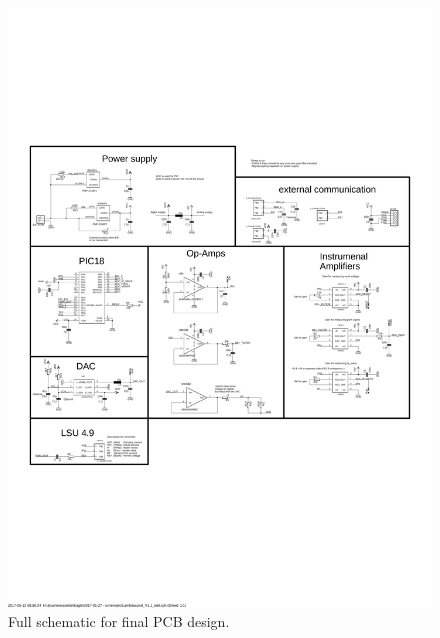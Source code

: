 

\begin{figure}[h]
    \centering
    \includegraphics[width=.94\textwidth]{Figures/Lambdasond_schematic.pdf}
    \caption{Full schematic for final PCB design.}
    \label{fig:Lambdasond_V1.1schematic}
\end{figure}